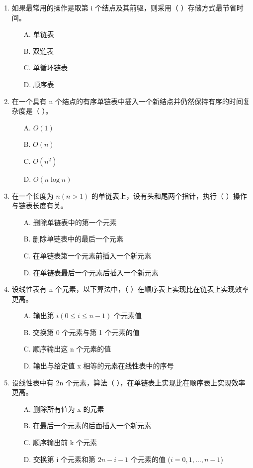 \documentclass[12pt, a4paper]{article}
\begin{document}
\begin{enumerate}
    \item 如果最常用的操作是取第 i 个结点及其前驱，则采用（ ）存储方式最节省时间。
    \begin{enumerate}
        \item[A.] 单链表
        \item[B.] 双链表
        \item[C.] 单循环链表
        \item[D.] 顺序表
    \end{enumerate}
    
    \item 在一个具有 n 个结点的有序单链表中插入一个新结点并仍然保持有序的时间复杂度是（ ）。
    \begin{enumerate}
        \item[A.] $O(1)$
        \item[B.] $O(n)$
        \item[C.] $O(n^2)$
        \item[D.] $O(n \log n)$
    \end{enumerate}
    
    \item 在一个长度为 $n (n>1)$ 的单链表上，设有头和尾两个指针，执行（ ）操作与链表长度有关。
    \begin{enumerate}
        \item[A.] 删除单链表中的第一个元素
        \item[B.] 删除单链表中的最后一个元素
        \item[C.] 在单链表第一个元素前插入一个新元素
        \item[D.] 在单链表最后一个元素后插入一个新元素
    \end{enumerate}
    
    \item 设线性表有 n 个元素，以下算法中，（ ）在顺序表上实现比在链表上实现效率更高。
    \begin{enumerate}
        \item[A.] 输出第 $i (0 \le i \le n-1)$ 个元素值
        \item[B.] 交换第 0 个元素与第 1 个元素的值
        \item[C.] 顺序输出这 n 个元素的值
        \item[D.] 输出与给定值 x 相等的元素在线性表中的序号
    \end{enumerate}
    
    \item 设线性表中有 2n 个元素，算法（ ），在单链表上实现比在顺序表上实现效率更高。
    \begin{enumerate}
        \item[A.] 删除所有值为 x 的元素
        \item[B.] 在最后一个元素的后面插入一个新元素
        \item[C.] 顺序输出前 k 个元素
        \item[D.] 交换第 i 个元素和第 $2n-i-1$ 个元素的值 ($i=0, 1, \dots, n-1$)
    \end{enumerate}
    

\end{enumerate}
\end{document}
